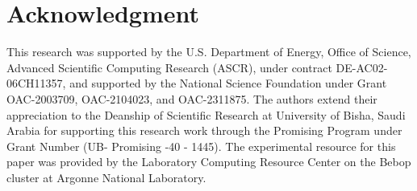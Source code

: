 \section{Acknowledgment}
This research was supported by the U.S. Department of Energy, Office of Science, Advanced Scientific Computing Research (ASCR), under contract DE-AC02-06CH11357, and supported by the National Science Foundation under Grant OAC-2003709, OAC-2104023, and OAC-2311875. The authors extend their appreciation to the Deanship of Scientific
Research at University of Bisha, Saudi Arabia for supporting this research work through the Promising
Program under Grant Number (UB- Promising -40 - 1445). The experimental resource for this paper was provided by the Laboratory Computing Resource Center on the Bebop cluster at Argonne National Laboratory. 
